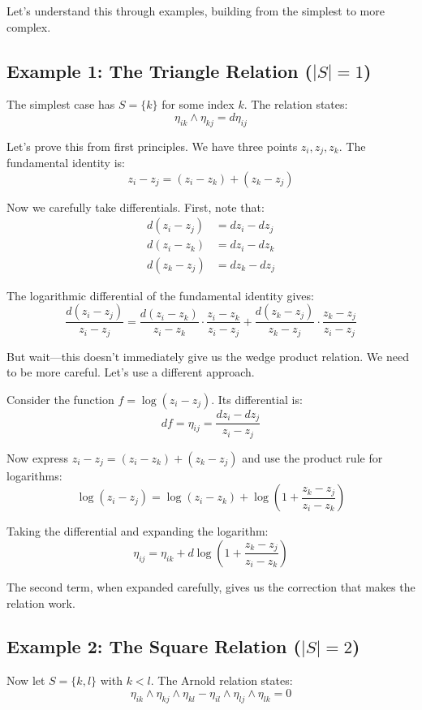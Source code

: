 Let's understand this through examples, building from the simplest to more complex.

\subsection{Example 1: The Triangle Relation ($|S| = 1$)}

The simplest case has $S = \{k\}$ for some index $k$. The relation states:
$$\eta_{ik} \wedge \eta_{kj} = d\eta_{ij}$$

Let's prove this from first principles. We have three points $z_i, z_j, z_k$. The fundamental identity is:
$$z_i - z_j = (z_i - z_k) + (z_k - z_j)$$

Now we carefully take differentials. First, note that:
\begin{align}
d(z_i - z_j) &= dz_i - dz_j \\
d(z_i - z_k) &= dz_i - dz_k \\
d(z_k - z_j) &= dz_k - dz_j
\end{align}

The logarithmic differential of the fundamental identity gives:
$$\frac{d(z_i - z_j)}{z_i - z_j} = \frac{d(z_i - z_k)}{z_i - z_k} \cdot \frac{z_i - z_k}{z_i - z_j} + \frac{d(z_k - z_j)}{z_k - z_j} \cdot \frac{z_k - z_j}{z_i - z_j}$$

But wait—this doesn't immediately give us the wedge product relation. We need to be more careful. Let's use a different approach.

Consider the function $f = \log(z_i - z_j)$. Its differential is:
$$df = \eta_{ij} = \frac{dz_i - dz_j}{z_i - z_j}$$

Now express $z_i - z_j = (z_i - z_k) + (z_k - z_j)$ and use the product rule for logarithms:
$$\log(z_i - z_j) = \log(z_i - z_k) + \log\left(1 + \frac{z_k - z_j}{z_i - z_k}\right)$$

Taking the differential and expanding the logarithm:
$$\eta_{ij} = \eta_{ik} + d\log\left(1 + \frac{z_k - z_j}{z_i - z_k}\right)$$

The second term, when expanded carefully, gives us the correction that makes the relation work.

\subsection{Example 2: The Square Relation ($|S| = 2$)}

Now let $S = \{k, l\}$ with $k < l$. The Arnold relation states:
$$\eta_{ik} \wedge \eta_{kj} \wedge \eta_{kl} - \eta_{il} \wedge \eta_{lj} \wedge \eta_{lk} = 0$$

